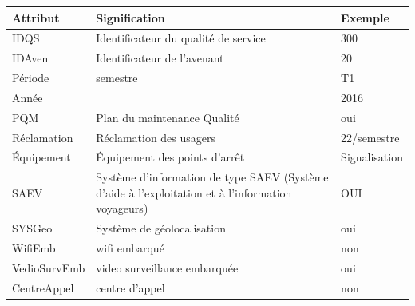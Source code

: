 \documentclass[a4paper]{report}
\begin{document}
\begin{doublespace}
	\begin{table}[H]
		\begin{center}
			\begin{tabularx}{17.5cm}{|p{2.75cm}|X|p{2.5cm}|}
				\hline
				\textbf{Attribut}                            & \textbf{Signification}                              &
				\textbf{Exemple}                                                                                                   \\
				\hline
				IDQS                                         & Identificateur du qualité de service                & 300           \\
				\hline
				IDAven                                       & Identificateur de l'avenant                         & 20            \\
				\hline
				Période                                      & semestre                                            & T1            \\
				\hline
				Année                                        &                                                     & 2016          \\
				\hline
				PQM                                          & Plan du maintenance Qualité                         & oui           \\
				\hline
				Réclamation                                  & Réclamation des usagers                             & 22/semestre   \\
				\hline
				Équipement                                   & Équipement des points d'arrêt                       & Signalisation \\
				\hline
				SAEV                                         & Système d'information de type SAEV (Système d'aide à
				l'exploitation et à l'information voyageurs) & OUI                                                                 \\
				\hline
				SYSGeo                                       & Système de géolocalisation                          & oui           \\
				\hline
				WifiEmb                                      & wifi embarqué                                       & non           \\
				\hline
				VedioSurvEmb                                 & video surveillance embarquée                        & oui           \\
				\hline
				CentreAppel                                  & centre d'appel                                      & non           \\

\end{tabularx}
\end{center}
\end{table}
\end{doublespace}
\end{document}
